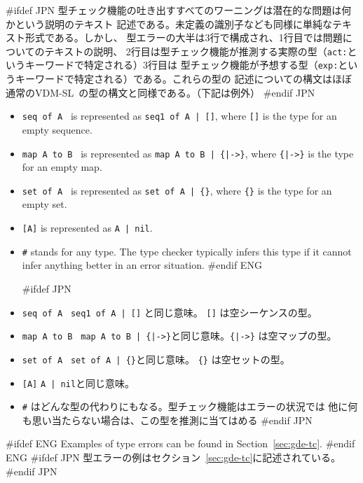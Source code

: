 \documentclass[\pformat,12pt]{article}
\newcommand{\vdmslpp}{VDM-SL}
\newcommand{\vdmslpp}{VDM++}
\begin{document}
#ifdef JPN
型チェック機能の吐き出すすべてのワーニングは潜在的な問題は何かという説明のテキスト
記述である。未定義の識別子なども同様に単純なテキスト形式である。しかし、
型エラーの大半は3行で構成され、1行目では問題についてのテキストの説明、
2行目は型チェック機能が推測する実際の型（\texttt{act:}というキーワードで特定される）3行目は
型チェック機能が予想する型（\texttt{exp:}というキーワードで特定される）である。これらの型の
記述についての構文はほぼ通常の\vdmslpp\ の型の構文と同様である。（下記は例外）
#endif JPN

\begin{itemize}
#ifdef ENG
\item {\tt seq of A } is represented as {\tt seq1 of A | []}, where
  {\tt []} is the type for an empty sequence.
  
\item {\tt map A to B } is represented as {\tt map A to B | \{|->\}},
  where {\tt \{|->\}} is the type for an empty map.
  
\item {\tt set of A } is represented as {\tt set of A | \{\}}, where
  {\tt \{\}} is the type for an empty set.
  
\item {\tt [A]} is represented as {\tt A | nil}.
  
\item {\tt \#} stands for any type. The type checker typically infers
  this type if it cannot infer anything better in an error situation.
#endif ENG

#ifdef JPN
\item {\tt seq of A }  {\tt seq1 of A | []} と同じ意味。 {\tt []} は空シーケンスの型。
  
\item {\tt map A to B } {\tt map A to B | \{|->\}}と同じ意味。{\tt \{|->\}} は空マップの型。 
  
\item {\tt set of A } {\tt set of A | \{\}}と同じ意味。 {\tt \{\}} は空セットの型。
  
\item {\tt [A]}  {\tt A | nil}と同じ意味。
  
\item {\tt \#} はどんな型の代わりにもなる。型チェック機能はエラーの状況では
  他に何も思い当たらない場合は、この型を推測に当てはめる
#endif JPN
\end{itemize}

#ifdef ENG
Examples of type errors can be found in Section~\ref{sec:gde-tc}.
#endif ENG
#ifdef JPN
型エラーの例はセクション~\ref{sec:gde-tc}に記述されている。
#endif JPN
\end{document}

